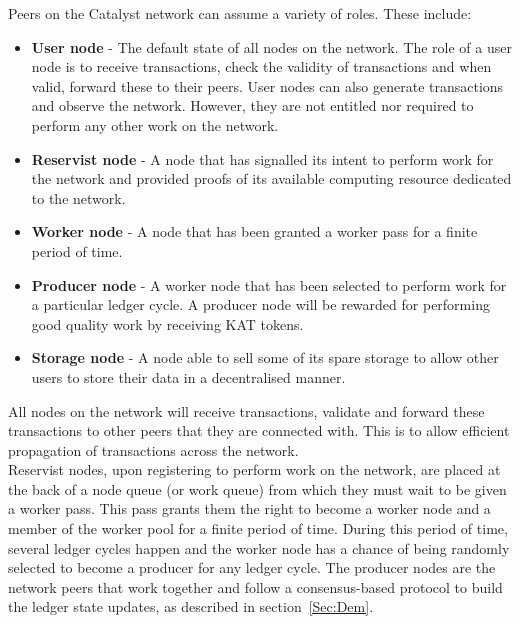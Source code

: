Peers on the Catalyst network can assume a variety of roles. These include:

\begin{itemize}

\item \textbf{User node} - The default state of all nodes on the network. The role of a user node is to receive transactions, check the  validity of transactions and when valid, forward these to their peers. User nodes can also generate transactions and observe the network. However, they are not entitled nor required to perform any other work on the network. 

\item \textbf{Reservist node} - A node that has signalled its intent to perform work for the network and provided proofs of its available computing resource dedicated to the network.

\item \textbf{Worker node} - A node that has been granted a worker pass for a finite period of time. 

\item \textbf{Producer node} - A worker node that has been selected to perform work for a particular ledger cycle. A producer node will be rewarded for performing good quality work by receiving KAT tokens. 

\item \textbf{Storage node} - A node able to sell some of its spare storage to allow other users to store their data in a decentralised manner. 

\end{itemize}

All nodes on the network will receive transactions, validate and forward these transactions to other peers that they are connected with. This is to allow efficient propagation of transactions across the network. \\

Reservist nodes, upon registering to perform work on the network, are placed at the back of a node queue (or work queue) from which they must wait to be given a worker pass. This pass grants them the right to become a worker node and a member of the worker pool for a finite period of time. During this period of time, several ledger cycles happen and the worker node has a chance of being randomly selected to become a producer for any ledger cycle. The producer nodes are the network peers that work together and follow a consensus-based protocol to build the ledger state updates, as described in section~\ref{Sec:Dem}. 